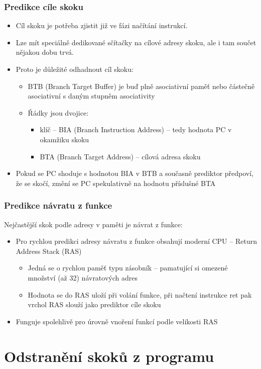 \documentclass{beamer}
\begin{document}
\begin{frame}
\frametitle{Predikce cíle skoku}

\begin{itemize}
\item Cíl skoku je potřeba zjistit již ve fázi načítání instrukcí.
\item Lze mít speciálně dedikované sčítačky na cílové adresy skoku, ale i tam součet nějakou dobu trvá.
\item Proto je důležité odhadnout cíl skoku:
\begin{itemize}
\item BTB (Branch Target Buffer) je buď plně asociativní paměť nebo částečně
asociativní s daným stupněm asociativity
\item Řádky jsou dvojice: 
\begin{itemize}
\item klíč -- BIA (Branch Instruction Address) -- tedy hodnota PC v okamžiku skoku
\item BTA (Branch Target Address) -- cílová adresa skoku
\end{itemize}
\end{itemize}
\item Pokud se PC shoduje s hodnotou BIA v BTB a současně prediktor předpoví, že se skočí, změní se PC spekulativně na hodnotu příslušné BTA
\end{itemize}
\end{frame}

\begin{frame}
\frametitle{Predikce návratu z funkce}

Nejčastější skok podle adresy v paměti je návrat z funkce:
\begin{itemize}
\item Pro rychlou predikci adresy návratu z funkce obsahují moderní CPU -- Return Address Stack (RAS)
\begin{itemize}
\item Jedná se o rychlou paměť typu zásobník -- pamatující si omezené množství (až 32) návratových adres
\item Hodnota se do RAS uloží při volání funkce, při načtení instrukce ret pak vrchol RAS slouží jako prediktor cíle skoku
\end{itemize}
\item Funguje spolehlivě pro úrovně vnoření funkcí podle velikosti RAS
\end{itemize}
\end{frame}

\section{Odstranění skoků z programu}
\end{document}
